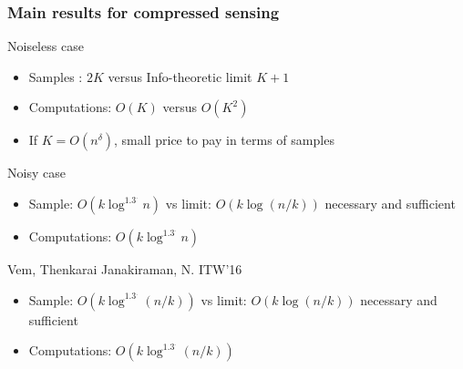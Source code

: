 \begin{frame} \frametitle{Main results for compressed sensing}



\begin{block}{Noiseless case}
\begin{itemize}
\item Samples : $2K$ versus Info-theoretic limit $K+1$
\item Computations: $O(K)$ versus $O(K^2)$
\item If $K = O(n^\delta)$, small price to pay in terms of samples
\end{itemize}
\end{block}

\begin{block}{Noisy case}
\begin{itemize}
\item Sample: $O(k \log^{1.{3}^{.}} n)$ vs limit: $O(k \log(n/k))$ necessary and sufficient
\item Computations: $O(k \log^{1.{3}^{.}} n)$
\end{itemize}
\end{block}
\pause
\begin{block}{Vem, Thenkarai Janakiraman, N. ITW'16}
\begin{itemize}
\item Sample: $O(k \log^{1.{3}^{.}} (n/k))$ vs limit: $O(k \log(n/k))$ necessary and sufficient
\item Computations: $O(k \log^{1.{3}^{.}} (n/k))$
\end{itemize}
\end{block}
\end{frame}


